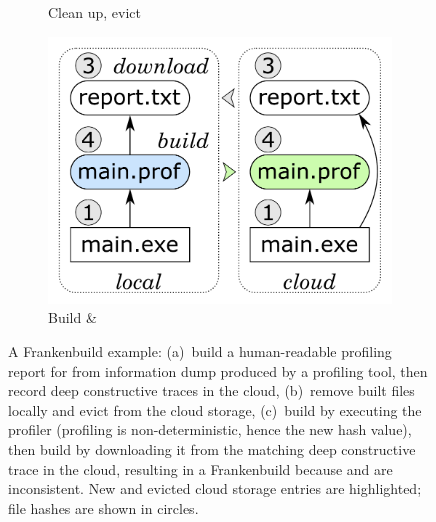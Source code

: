 \begin{figure}
\begin{subfigure}[b]{0.32\linewidth}
\caption{Clean up, evict }
\end{subfigure}
\begin{subfigure}[b]{0.34\linewidth}
\centerline{\includegraphics[scale=0.26]{fig/frankenbuild-example-rebuild.pdf}}
\caption{Build  \& }
\end{subfigure}
\caption{A Frankenbuild example: (a)~build a human-readable profiling report for
 from information dump  produced by a profiling
tool, then record deep constructive traces in the cloud, (b)~remove built files
locally and evict  from the cloud storage, (c)~build
 by executing the profiler (profiling is non-deterministic, hence
the new hash value), then build  by downloading it from the
matching deep constructive trace in the cloud, resulting in a Frankenbuild
because  and  are inconsistent. New and evicted
cloud storage entries are highlighted; file hashes are shown in circles.
\label{fig-frankenbuild}}
\end{figure}

